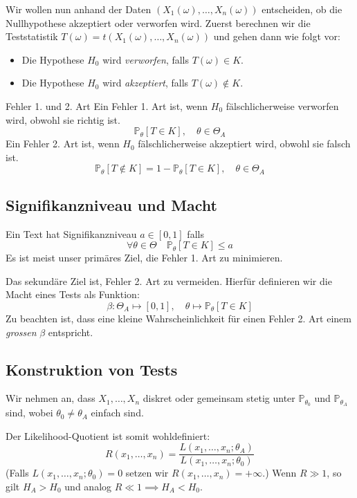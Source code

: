 \documentclass[a4paper,10pt]{article}
\def\P{\mathbb{P}}
\begin{document}
Wir wollen nun anhand der Daten \((X_1(\omega), \ldots, X_n(\omega))\) entscheiden, ob die Nullhypothese akzeptiert oder verworfen wird. Zuerst berechnen wir die Teststatistik \(T(\omega) = t(X_1(\omega), \ldots, X_n(\omega))\) und gehen dann wie folgt vor:
\begin{itemize}
    \item Die Hypothese \(H_0\) wird \textit{verworfen}, falls \(T(\omega) \in K\).
    \item Die Hypothese \(H_0\) wird \textit{akzeptiert}, falls \(T(\omega) \notin K\).
\end{itemize}
\begin{subbox}{Fehler 1. und 2. Art}
    Ein Fehler 1. Art ist, wenn \(H_0\) fälschlicherweise verworfen wird, obwohl sie richtig ist.
    \[\P_\theta[T \in K], \quad \theta \in \Theta_A\]
    \noindent Ein Fehler 2. Art ist, wenn \(H_0\) fälschlicherweise akzeptiert wird, obwohl sie falsch ist.
    \[\P_\theta[T\notin K] = 1 - \P_\theta[T \in K], \quad \theta \in \Theta_A\]
\end{subbox}
\subsection{Signifikanzniveau und Macht}
Ein Text hat Signifikanzniveau \(a \in [0,1]\) falls
\[\forall \theta \in \Theta \quad \P_\theta[T \in K] \le a\]
Es ist meist unser primäres Ziel, die Fehler 1. Art zu minimieren.

Das sekundäre Ziel ist, Fehler 2. Art zu vermeiden. Hierfür definieren wir die Macht eines Tests als Funktion:
\[\beta : \Theta_A \mapsto [0,1], \quad \theta \mapsto \P_\theta[T \in K]\]
Zu beachten ist, dass eine kleine Wahrscheinlichkeit für einen Fehler 2. Art einem \textit{grossen} \(\beta\) entspricht.

\subsection{Konstruktion von Tests}
Wir nehmen an, dass \(X_1, \ldots, X_n\) diskret oder gemeinsam stetig unter \(\P_{\theta_0}\) und \(\P_{\theta_A}\) sind, wobei \(\theta_0 \ne \theta_A\) einfach sind.

\noindent Der Likelihood-Quotient ist somit wohldefiniert:
\[R(x_1, \ldots, x_n) = \frac{L(x_1,\ldots, x_n;\theta_A)}{L(x_1, \ldots, x_n;\theta_0)}\]
(Falls \(L(x_1, \ldots, x_n; \theta_0) = 0\) setzen wir \(R(x_1, \ldots, x_n) = +\infty\).) Wenn \(R \gg 1\), so gilt \(H_A > H_0\) und analog \(R \ll 1 \implies H_A < H_0\).
\end{document}

